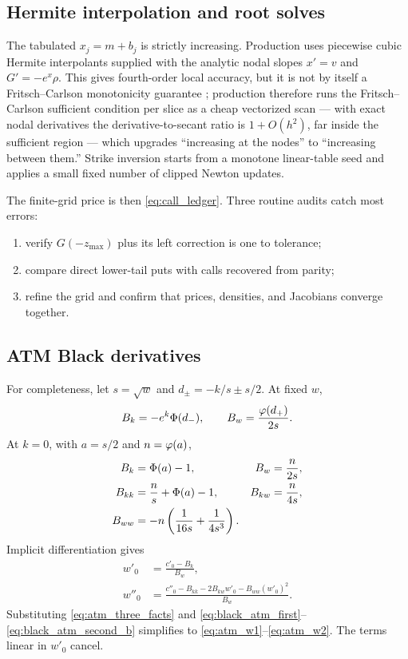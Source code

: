 \documentclass[11pt]{article}
\begin{document}
\subsection{Hermite interpolation and root solves}

The tabulated $x_j=m+b_j$ is strictly increasing.  Production uses piecewise
cubic Hermite interpolants supplied with the analytic nodal slopes
$x'=v$ and $G'=-e^x\rho$.  This gives fourth-order local accuracy, but it is
not by itself a Fritsch--Carlson monotonicity guarantee \cite{fritschcarlson};
production therefore runs the Fritsch--Carlson sufficient condition per slice
as a cheap vectorized scan --- with exact nodal derivatives the
derivative-to-secant ratio is $1+O(h^2)$, far inside the sufficient region ---
which upgrades ``increasing at the nodes'' to ``increasing between them.''
Strike inversion starts from a monotone linear-table seed and applies a small
fixed number of clipped Newton updates.

The finite-grid price is then \eqref{eq:call_ledger}.  Three routine audits
catch most errors:
\begin{enumerate}[leftmargin=1.6em]
\item verify $G(-z_{\max})$ plus its left correction is one to tolerance;
\item compare direct lower-tail puts with calls recovered from parity;
\item refine the grid and confirm that prices, densities, and Jacobians
converge together.
\end{enumerate}

\subsection{ATM Black derivatives}

For completeness, let $s=\sqrt w$ and
$d_\pm=-k/s\pm s/2$.  At fixed $w$,
\begin{equation}
B_k=-e^k\Phi(d_-),\qquad
B_w=\frac{\varphi(d_+)}{2s}.
\label{eq:black_first_partials}
\end{equation}
At $k=0$, with $a=s/2$ and $n=\varphi(a)$,
\begin{align}
B_k&=\Phi(a)-1, &
B_w&=\frac{n}{2s}, \label{eq:black_atm_first}\\
B_{kk}&=\frac{n}{s}+\Phi(a)-1, &
B_{kw}&=\frac{n}{4s}, \label{eq:black_atm_second_a}\\
B_{ww}&=
-n\left(\frac{1}{16s}+\frac{1}{4s^3}\right).
\label{eq:black_atm_second_b}
\end{align}
Implicit differentiation gives
\begin{align}
w'_0&=\frac{c'_0-B_k}{B_w},\label{eq:implicit_w1}\\
w''_0&=
\frac{c''_0-B_{kk}-2B_{kw}w'_0-B_{ww}(w'_0)^2}{B_w}.
\label{eq:implicit_w2}
\end{align}
Substituting \eqref{eq:atm_three_facts} and
\eqref{eq:black_atm_first}--\eqref{eq:black_atm_second_b} simplifies to
\eqref{eq:atm_w1}--\eqref{eq:atm_w2}.  The terms linear in $w'_0$ cancel.
\end{document}
